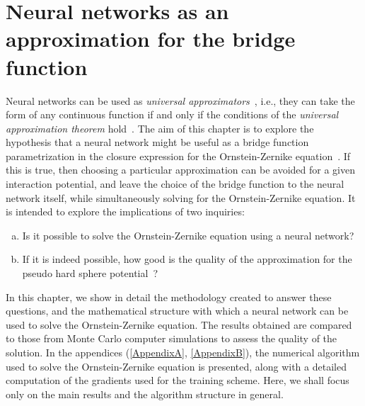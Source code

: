\newcommand{\vecr}{\mathbf{r}}
\newcommand{\veck}{\mathbf{k}}
\newcommand{\nnet}{N_{\theta}(\mathbf{r})}
\def\Itemautorefname{Figure}
\chapter{Neural networks as an approximation for the bridge function}
\label{Cap4}


Neural networks can be used as \emph{universal approximators}~\cite{hornikMultilayerFeedforwardNetworks1989, hornikApproximationCapabilitiesMultilayer1991, cybenkoApproximationSuperpositionsSigmoidal1989},
i.e., they can take the form of any continuous function if and only if the conditions of the
\emph{universal approximation theorem} hold~\cite{parkMinimumWidthUniversal2020,zhouUniversalityDeepConvolutional2020}.
The aim of this chapter is to explore the hypothesis that a neural network might be 
useful as a bridge function parametrization in the closure expression for the 
Ornstein-Zernike equation~\cite{hansenTheorySimpleLiquids2013}.
If this is true, then choosing a particular approximation can be avoided for a given 
interaction potential, and leave the choice of the bridge function to the neural network 
itself, while simultaneously solving for the Ornstein-Zernike equation. It is intended to
explore the implications of two inquiries:

\begin{enumerate}[(a)]
    \item Is it possible to solve the Ornstein-Zernike equation using a neural network?
    \item If it is indeed possible, how good is the quality of the approximation for the pseudo hard sphere potential~\cite{baezUsingSecondVirial2018}?
\end{enumerate}

In this chapter, we show in detail the methodology created to answer these questions, and
the mathematical structure with which a neural network can be used to solve the
Ornstein-Zernike equation.
The results obtained are compared to those from Monte Carlo computer simulations to assess 
the quality of the solution.
In the appendices (\autoref{AppendixA}, \autoref{AppendixB}), the numerical algorithm used 
to solve the Ornstein-Zernike equation
is presented, along with a detailed computation of the gradients used for the
training scheme. Here, we shall focus only on the main results and the algorithm structure
in general.

